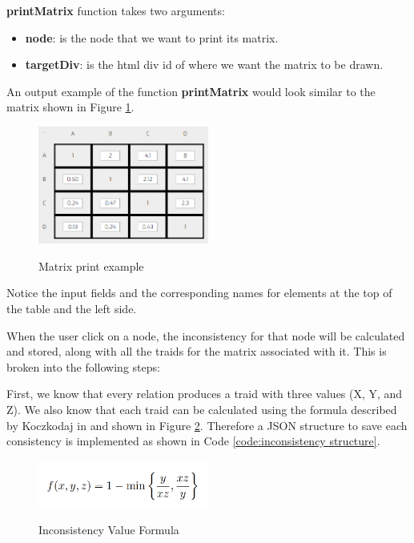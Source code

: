 \documentclass[11pt]{article} %
\begin{document}
\noindent
\textbf{printMatrix} function takes two arguments:
\begin{itemize}
\item \textbf{node}: is the node that we want to print its matrix.
\item \textbf{targetDiv}: is the html div id of where we want the matrix to be drawn.
\end{itemize}

\noindent
An output example of the function \textbf{printMatrix} would look similar to the matrix shown in Figure \ref{matrixExample}.

\begin{figure}[H]
  \caption{Matrix print example}
  \centering
  \includegraphics[width=0.5\textwidth]{matrixExample}
  \label{matrixExample}
\end{figure}
\noindent
Notice the input fields and the corresponding names for elements at the top of the table and the left side.
\noindent

When the user click on a node, the inconsistency for that node will be calculated and stored, along with all the traids for the matrix associated with it. This is broken into the following steps:

First, we know that every relation produces a traid with three values (X, Y, and Z). We also know that each traid can be calculated using the formula described by Koczkodaj in \cite{DBLP} and shown in Figure \ref{formula:inconsistencyValue}. Therefore a JSON structure to save each consistency is implemented as shown in Code \ref{code:inconsistency structure}.

\begin{figure}[H]
  \caption{Inconsistency Value Formula}
  \centering
  \includegraphics[width=0.5\textwidth]{inconsistancyFormula}
  \label{formula:inconsistencyValue}
\end{figure}
\end{document}
